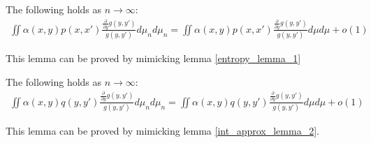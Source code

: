 \begin{lemma} \label{appendix_lemma_1}
    The following holds as $n \to \infty$:
    \begin{align}
        \iint \alpha(x,y)p(x,x') \frac{\frac{\partial}{\partial y}g(y,y')}{g(y,y')} d\mu_n d\mu_n = \iint \alpha(x,y)p(x,x') \frac{\frac{\partial}{\partial y}g(y,y')}{g(y,y')} d\mu d\mu + o(1)
    \end{align}
\end{lemma}
This lemma can be proved by mimicking lemma \ref{entropy_lemma_1}
\begin{lemma} \label{appendix_lemma_2}
    The following holds as $n \to \infty$:
    \begin{align}
        \iint \alpha(x,y)q(y,y') \frac{\frac{\partial}{\partial y}g(y,y')}{g(y,y')} d\mu_n d\mu_n = \iint \alpha(x,y)q(y,y') \frac{\frac{\partial}{\partial y}g(y,y')}{g(y,y')} d\mu d\mu + o(1)
    \end{align}
\end{lemma}
This lemma can be proved by mimicking lemma \ref{int_approx_lemma_2}.